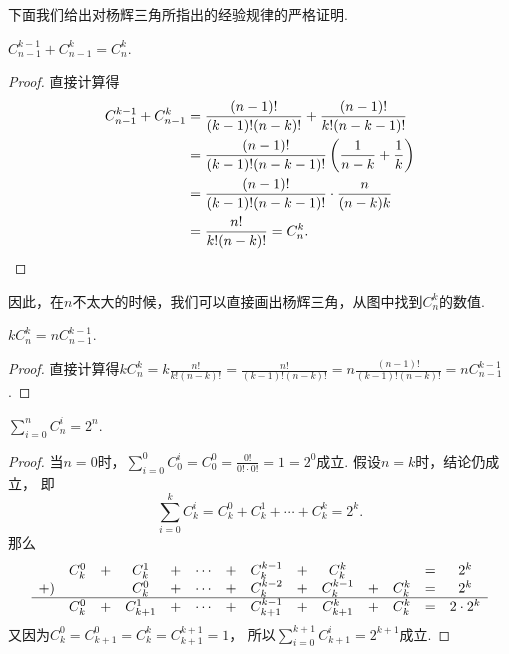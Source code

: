 下面我们给出对杨辉三角所指出的经验规律的严格证明.
\begin{property}\label{theorem:组合数性质2}
\(C_{n-1}^{k-1} + C_{n-1}^k = C_n^k\).
\begin{proof}
直接计算得\begin{align*}
	C_{n-1}^{k-1} + C_{n-1}^k
	&= \frac{(n-1)!}{(k-1)! (n-k)!} + \frac{(n-1)!}{k! (n-k-1)!} \\
	&= \frac{(n-1)!}{(k-1)! (n-k-1)!} \left( \frac{1}{n-k} + \frac{1}{k} \right) \\
	&= \frac{(n-1)!}{(k-1)! (n-k-1)!} \cdot \frac{n}{(n-k)k} \\
	&= \frac{n!}{k! (n-k)!}
	= C_n^k. \qedhere
\end{align*}
\end{proof}
\end{property}
\begin{remark}
因此，在\(n\)不太大的时候，我们可以直接画出杨辉三角，从图中找到\(C_n^k\)的数值.
\end{remark}

\begin{property}
\(k C_n^k = n C_{n-1}^{k-1}\).
\begin{proof}
直接计算得\(
	k C_n^k
	= k \frac{n!}{k!(n-k)!}
	= \frac{n!}{(k-1)!(n-k)!}
	= n \frac{(n-1)!}{(k-1)!(n-k)!}
	= n C_{n-1}^{k-1}
\).
\end{proof}
\end{property}

\begin{property}\label{theorem:组合数性质3}
\(\sum_{i=0}^n C_n^i = 2^n\).
\begin{proof}
当\(n=0\)时，\(\sum_{i=0}^0 C_0^i = C_0^0 = \frac{0!}{0! \cdot 0!} = 1 = 2^0\)成立.
假设\(n=k\)时，结论仍成立，
即\begin{equation*}
	\sum_{i=0}^k C_k^i
	= C_k^0 + C_k^1 + \dotsb + C_k^k = 2^k.
\end{equation*}
那么\begin{equation*}
	\begin{array}{*{14}{c}}
		& C_k^0 &+& C_k^1 &+& \dotsb &+& C_k^{k-1} &+& C_k^k && &=& 2^k \\
		+) & && C_k^0 &+& \dotsb &+& C_k^{k-2} &+& C_k^{k-1} &+& C_k^k &=& 2^k \\ \hline
		& C_k^0 &+& C_{k+1}^1 &+& \dotsb &+& C_{k+1}^{k-1} &+& C_{k+1}^k &+& C_k^k &=& 2 \cdot 2^k
	\end{array}
\end{equation*}
又因为\(C_k^0 = C_{k+1}^0 = C_k^k = C_{k+1}^{k+1} = 1\)，
所以\(
	\sum_{i=0}^{k+1} C_{k+1}^i = 2^{k+1}
\)成立.
\end{proof}
\end{property}

